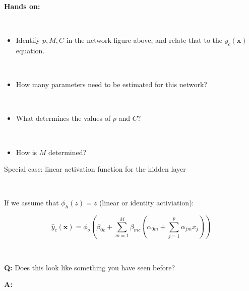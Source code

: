 \documentclass[10pt,ignorenonframetext,]{beamer}
\providecommand{\tightlist}{%
  \setlength{\itemsep}{0pt}\setlength{\parskip}{0pt}}
\begin{document}
\begin{frame}

\textbf{Hands on:}

\(~\)

\begin{itemize}
\tightlist
\item
  Identify \(p, M, C\) in the network figure above, and relate that to
  the \(y_{c}({\boldsymbol x})\) equation.
\end{itemize}

\(~\)

\begin{itemize}
\tightlist
\item
  How many parameters need to be estimated for this network?
\end{itemize}

\(~\)

\begin{itemize}
\tightlist
\item
  What determines the values of \(p\) and \(C\)?
\end{itemize}

\(~\)

\begin{itemize}
\tightlist
\item
  How is \(M\) determined?
\end{itemize}

\end{frame}

\begin{frame}

\begin{block}{Special case: linear activation function for the hidden
layer}

\(~\)

If we assume that \(\phi_h(z)=z\) (linear or identity activiation):

\[
\hat{y}_c({\boldsymbol x})=\phi_o(\beta_{0c}+\sum_{m=1}^M \beta_{mc}(\alpha_{0m}+\sum_{j=1}^p \alpha_{jm}x_{j}))
\]

\(~\) \(~\)

\textbf{Q:} Does this look like something you have seen before?

\textbf{A:}

\end{block}

\end{frame}
\end{document}
